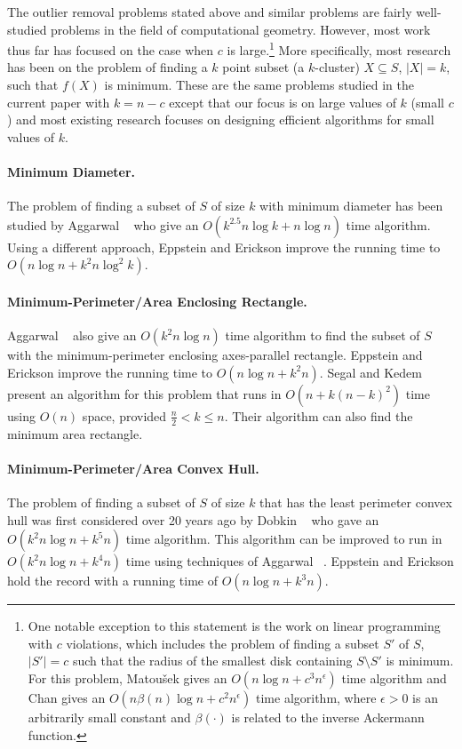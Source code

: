 \documentclass[lotsofwhite]{patmorin}
\begin{document}
The outlier removal problems stated above and similar problems are
fairly well-studied problems in the field of computational geometry.
However, most work thus far has focused on the case when $c$ is
large.\footnote{One notable exception to this statement is the work on
linear programming with $c$ violations, which includes the problem of
finding a subset $S'$ of $S$, $|S'|=c$ such that the radius of the
smallest disk containing $S\setminus S'$ is minimum.  For this
problem, Matou\v{s}ek gives an $O(n\log n + c^3 n^{\epsilon})$ time
algorithm \cite{m95} and Chan \cite{c05} gives an $O(n\beta(n)\log n +
c^2n^\epsilon)$ time algorithm, where $\epsilon >0$ is an arbitrarily
small constant and $\beta(\cdot)$ is related to the inverse Ackermann
function.} More specifically, most research has been on the problem of
finding a $k$ point subset (a $k$-cluster) $X\subseteq S$, $|X|=k$,
such that $f(X)$ is minimum. These are the same problems studied in
the current paper with $k=n-c$ except that our focus is on large
values of $k$ (small $c$) and most existing research focuses on
designing efficient algorithms for small values of $k$.

\paragraph{Minimum Diameter.} The problem of finding a subset of $S$ of size
$k$ with minimum diameter has been studied by Aggarwal \etal\
\cite{aiks89} who give an $O(k^{2.5}n\log k+n\log n)$ time algorithm.
Using a different approach, Eppstein and Erickson \cite{ee94} improve
the running time to $O(n\log n + k^2 n\log^2 k)$.

\paragraph{Minimum-Perimeter/Area Enclosing Rectangle.} Aggarwal
\etal\ \cite{aiks89} also give an $O(k^2n\log n)$ time algorithm to
find the subset of $S$ with the minimum-perimeter enclosing
axes-parallel rectangle.  Eppstein and Erickson \cite{ee94} improve
the running time to $O(n\log n + k^2 n)$.  Segal and Kedem \cite{sk98}
present an algorithm for this problem that runs in $O(n+k(n-k)^2)$
time using $O(n)$ space, provided $\frac{n}{2}<k\le n$. Their
algorithm can also find the minimum area rectangle.

\paragraph{Minimum-Perimeter/Area Convex Hull.} The problem of finding a
subset of $S$ of size $k$ that has the least perimeter convex hull was
first considered over 20 years ago by Dobkin \etal\ \cite{ddg83} who
gave an $O(k^2n\log n + k^5 n)$ time algorithm.  This algorithm can be
improved to run in $O(k^2 n\log n + k^4 n)$ time using techniques of
Aggarwal \etal\ \cite{aiks89}.  Eppstein and Erickson \cite{ee94} hold
the record with a running time of $O(n\log n + k^3 n)$.
\end{document}
